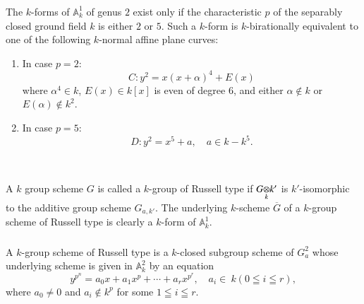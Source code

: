 \subsubsection{}\label{chap3:1.5.3}
\begin{lemma*}[(\cf {[ibid.; Th.\@ 2.4]}) ]
  The $k$-forms of $\mathbb{A}^{1}_{k}$ of genus $2$ exist only if the
  characteristic $p$ of the separably closed ground field $k$ is either
  $2$ or $5$. Such a $k$-form is $k$-birationally equivalent to one of
  the following $k$-normal affine plane curves:
  \begin{enumerate}
    \renewcommand{\theenumi}{\Roman{enumi}}
    \renewcommand{\labelenumi}{\rm(\theenumi)}
  \item In case $p=2$:
    $$
    C:y^{2}=x(x+\alpha)^{4}+E(x)
    $$
    where $\alpha^{4}\in k$, $E(x)\in k[x]$ is even of degree $6$, and
    either $\alpha\not\in k$ or $E(\alpha)\not\in k^{2}$.
    
  \item In case $p=5$:
    $$
    D:y^{2}=x^{5}+a,\quad a\in k-k^{5}.
    $$\pageoriginale\
  \end{enumerate}
\end{lemma*}

\subsection{}\label{chap3:1.6}
A $k$ group scheme $G$ is called a $k$-group of Russell type if
$\foprod{G}{k'}{k}$ is $k'$-isomorphic to the additive group scheme
$G_{a,k'}$. The underlying $k$-scheme $\overline{G}$ of a $k$-group
scheme of Russell type is clearly a $k$-form of $\mathbb{A}^{1}_{k}$.

\subsubsection{}\label{chap3:1.6.1}
\begin{lemma*}
  A $k$-group scheme of Russell type is a $k$-closed subgroup scheme of
  $G^{2}_{a}$ whose underlying scheme is given in $\mathbb{A}^{2}_{k}$
  by an equation
  $$
  y^{p^{n}}=a_{0}x+a_{1}x^{p}+\cdots+a_{r}x^{p^{r}},\quad a_{i}\in~
  k(0\leqq i\leqq r),
  $$
  where $a_{0}\neq 0$ and $a_{i}\not\in k^{p}$ for some $1\leqq i\leqq r$.
\end{lemma*}


